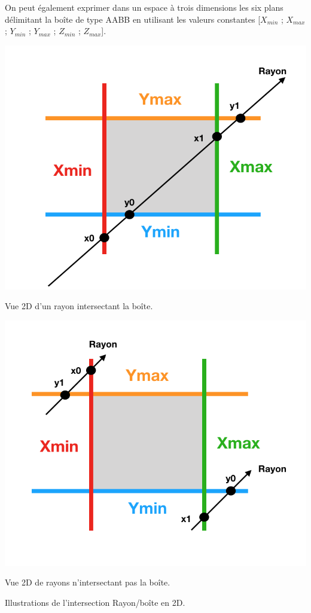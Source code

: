 On peut également exprimer dans un espace à trois dimensions les six plans délimitant la boîte de type \gls{AABB} en utilisant les valeurs constantes [$X_{min}$ ; $X_{max}$  ; $Y_{min}$  ; $Y_{max}$ ; $Z_{min}$ ; $Z_{max}$].
%
\begin{figureth}
	\begin{subfigureth}{0.45\textwidth}
		\includegraphics[width=\linewidth]{images/AABB}
		\caption{Vue 2D d'un rayon intersectant la boîte.}
		\label{AABB}
	\end{subfigureth}
	\qquad
	\begin{subfigureth}{0.45\textwidth}
		\includegraphics[width=\linewidth]{images/AABB2}
		\caption{Vue 2D de rayons n'intersectant pas la boîte.}
		\label{AABB2}
	\end{subfigureth}
	\caption{Illustrations de l'intersection Rayon/boîte en 2D.}
\end{figureth}
